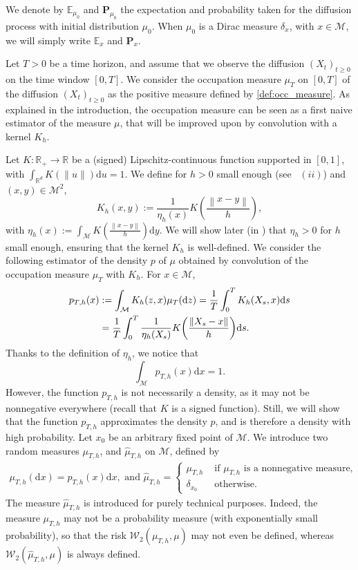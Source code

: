 \documentclass[10pt,a4paper]{article}
\newcommand{\E}{{\mathbb E}}
\renewcommand{\P}{{\mathbf P}}
\newcommand{\R}{{\mathbb R}}
\newcommand\cM{\mathcal{M}}
\newcommand\cW{\mathcal{W}}
\newcommand\dd{\mathrm{d}}
\newcommand{\NRM}[1]{{{\left\| #1\right\|}}} %
\newcommand{\PAR}[1]{{{\left(#1\right)}}} %
\begin{document}
We denote by $\E_{\mu_0}$ and $\P_{\mu_0}$ the expectation and probability taken for the diffusion process with initial distribution $\mu_0$. When $\mu_0$ is a Dirac measure $\delta_x$, with $x\in\cM$, we will simply write $\E_x$ and $\P_x$.

Let $T>0$ be a time horizon, and assume that we observe the diffusion $(X_t)_{t\ge 0}$ on the time window $[0,T]$. We consider the occupation measure $\mu_T$ on $[0,T]$ of the diffusion $(X_t)_{t\ge 0}$ as the positive measure defined by \eqref{def:occ_measure}. 
As explained in the introduction, the occupation measure can be seen as a first naive estimator of the measure $\mu$, that will be improved upon by convolution with a kernel $K_h$.

    Let $K: \mathbb{R}_+\rightarrow \mathbb{R}$ be a (signed) Lipschitz-continuous function  supported in $[0,1]$, with $\int_{\R^d} K(\|u\|)\dd u=1$. 
We define for $h>0$ small enough (see~ $(ii)$) and $(x,y)\in\cM^2$,
\begin{equation}\label{eq:def-K_h}
K_h(x,y):=\frac{1}{\eta_h(x)}K\PAR{\frac{\NRM{x-y}}{h}},
\end{equation}
with $\displaystyle{\eta_h(x):=\int_\cM K\PAR{\frac{\NRM{x-y}}{h}}\dd y} $. We will show later (in ) that $\eta_h>0$  for $h$ small enough, ensuring that the kernel $K_h$ is well-defined. We consider the following estimator of the density $p$ of $\mu$ obtained by convolution of the occupation measure $\mu_T$ with $K_h$. For $x\in \cM$, 
\begin{align}\label{eq:def-p_{T,h}}
	p_{T,h}(x)&:=  
	\int_\cM K_h(z,x)\mu_T(\dd z)=\frac{1}{T}\int_0^TK_h\PAR{X_s,x}\dd s \nonumber\\
 &=\frac{1}{T}\int_0^T\frac{1}{\eta_h(X_s)}K\PAR{\frac{\NRM{X_s-x}}{h}}\dd s.
\end{align}
Thanks to the definition of $\eta_h$, we notice that
\[
\int_\cM p_{T,h}(x)\dd x=1.
\]
However, the function $p_{T,h}$ is not necessarily a density, as it may not be nonnegative everywhere (recall that $K$ is a signed function). Still, we will show  that the function $p_{T,h}$ approximates the density $p$, and is therefore a density  with high probability. 
Let $x_0$ be an arbitrary fixed point of $\cM$. We  introduce two random measures $\mu_{T,h}$, and $\widehat{\mu}_{T,h}$ on $\cM$, defined by
\begin{align}\label{def:mu_Th}
    \mu_{T,h}(\dd x) = p_{T,h}(x)  \dd x,\text{ and }
    \widehat{\mu}_{T,h}=\begin{cases}
	\mu_{T,h}    &\text{ if }\mu_{T,h} \text{ is a nonnegative measure,}\\
 \delta_{x_0} &\text{ otherwise.}
\end{cases}
\end{align}
The measure $\widehat{\mu}_{T,h}$  is introduced for purely technical purposes. Indeed, the measure $\mu_{T,h}$ may not be a probability measure (with exponentially small probability), so that the risk $\cW_2(\mu_{T,h},\mu)$ may not even be defined, whereas $\cW_2(\widehat{\mu}_{T,h},\mu)$ is always defined.
\end{document}
